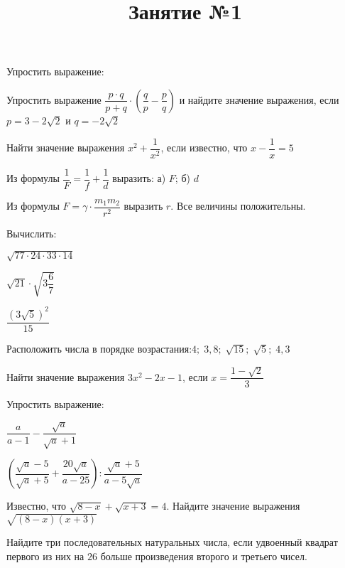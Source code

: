 \title{Занятие №1}
\begin{listofex}
	\item Упростить выражение:
	\begin{enumcols}[itemcolumns=2]
		\item {}
		\item {}
	\end{enumcols}
	\item Упростить выражение \( \dfrac{p\cdot q}{p+q}\cdot\left( \dfrac{q}{p}-\dfrac{p}{q} \right) \) и найдите значение выражения, если \( p=3-2\sqrt{2} \) и \( q=-2\sqrt{2} \)
	\item Найти значение выражения \( x^2+\dfrac{1}{x^2} \), если известно, что \( x-\dfrac{1}{x}=5 \)
	\item Из формулы \( \dfrac{1}{F}=\dfrac{1}{f}+\dfrac{1}{d} \) выразить: а) \( F \); б) \( d \)
	\item Из формулы \( F=\gamma\cdot\dfrac{m_1m_2}{r^2} \) выразить \( r \). Все величины положительны.
	\item Вычислить:
	\begin{enumcols}[itemcolumns=3]
		\item \( \sqrt{77\cdot24\cdot33\cdot14} \)
		\item \( \sqrt{21}\cdot\sqrt{3\dfrac{6}{7}} \)
		\item \( \dfrac{(3\sqrt{5})^2}{15} \)
	\end{enumcols}
	\item Расположить числа в порядке возрастания:\quad\( 4;\;3,8;\;\sqrt{15};\;\sqrt{5};\;4,3 \)
	\item Найти значение выражения \( 3x^2-2x-1 \), если \( x=\dfrac{1-\sqrt{2}}{3} \)
	\item Упростить выражение:
	\begin{enumcols}[itemcolumns=2]
		\item \( \dfrac{a}{a-1}-\dfrac{\sqrt{a}}{\sqrt{a}+1} \)
		\item \( \left( \dfrac{\sqrt{a}-5}{\sqrt{a}+5}+\dfrac{20\sqrt{a}}{a-25} \right):\dfrac{\sqrt{a}+5}{a-5\sqrt{a}} \)
	\end{enumcols}
	\item Известно, что \( \sqrt{8-x}+\sqrt{x+3}=4 \). Найдите значение выражения \( \sqrt{(8-x)(x+3)} \)
	\item Найдите три последовательных натуральных числа, если удвоенный квадрат
	первого из них на \( 26 \) больше произведения второго и третьего чисел.
\end{listofex}
